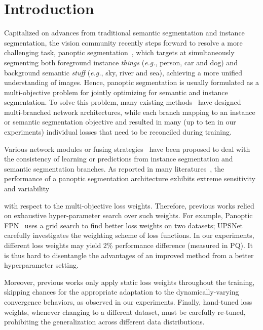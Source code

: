 \documentclass[letterpaper]{article} \usepackage{aaai21}  \usepackage{times}  \usepackage{helvet} \usepackage{courier}  \usepackage[hyphens]{url}  \usepackage{graphicx} \urlstyle{rm} \def\UrlFont{\rm}  \usepackage{natbib}  \usepackage{caption} \frenchspacing  \setlength{\pdfpagewidth}{8.5in}  \setlength{\pdfpageheight}{11in}
\begin{document}
 \section{Introduction}
 Capitalized on advances from traditional semantic segmentation and instance segmentation, 
 the vision community  recently steps forward to resolve a more challenging task, 
 panoptic segmentation~\cite{panoptic_segmentation}, 
 which targets at simultaneously segmenting both foreground instance \textit{things} 
 (\textit{e.g.}, person, car and dog) and background semantic \textit{stuff} (\textit{e.g.}, sky, river and sea), 
 achieving a more unified understanding of images. 
 Hence, panoptic segmentation is usually formulated as a multi-objective problem 
 for jointly optimizing for semantic and instance segmentation. 
 To solve this problem, many existing methods~\cite{panopticFPNkirillov2019,upsnetxiong2019,seamlessporzi2019,spatialflowchen2019} 
 have designed multi-branched network architectures, 
 while each branch mapping to an instance or semantic segmentation objective 
and resulted in many (up to ten in our experiments) 
 individual losses that need to be reconciled during training.
 
 Various network modules or fusing strategies~\cite{panopticFPNkirillov2019,upsnetxiong2019,oanetLiu2019,lazarow2020learningocfusion} 
 have been proposed to deal with the consistency of learning 
 or predictions from instance segmentation and semantic segmentation branches. 
As reported in many literatures~\cite{panopticFPNkirillov2019,upsnetxiong2019},
 the performance of a panoptic segmentation architecture exhibits extreme sensitivity and variability 

 with respect to the multi-objective loss weights.
 Therefore, previous works relied on exhaustive hyper-parameter search over such weights. 
 For example, Panoptic FPN~\cite{panopticFPNkirillov2019} uses a grid search to find better loss weights 
 on two datasets; UPSNet~\cite{upsnetxiong2019} carefully investigates the weighting scheme 
 of loss functions. In our experiments, different loss weights may yield 2\% performance difference 
 (measured in PQ).
It is thus hard to disentangle the advantages of an improved method from a better hyperparameter 
 setting. 
 
 Moreover, previous works only apply static loss weights throughout the training, 
 skipping chances for the appropriate adaptation to the dynamically-varying convergence 
 behaviors, as observed in our experiments. 
 Finally, hand-tuned loss weights, whenever changing to a different dataset, 
 must be carefully re-tuned, 
 prohibiting the generalization across different data distributions.
 
\end{document}
